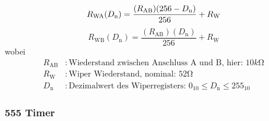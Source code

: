 \begin{equation}
    R_{\text{\text{WA}}}(D_{\text{n}}) = \frac{(R_{\text{AB}}) (256 - D_{\text{n}})}{256} + R_{\text{W}}
    \label{eq:resistance1}
\end{equation}
\begin{equation}
    R_{\text{WB}}(D_{\text{n}}) = \frac{(R_{\text{AB}}) (D_{\text{n}})}{256} + R_{\text{W}}
    \label{eq:resistance2}
\end{equation}
wobei
\begin{align*}
    R_{\text{AB}} &: \text{Wiederstand zwischen Anschluss A und B, hier: } 10\si{k\ohm} \\
    R_{\text{W}} &: \text{Wiper Wiederstand, nominal: } 52\si{\ohm}  \\
    D_{\text{n}} &: \text{Dezimalwert des Wiperregisters: } 0_{10} \leq D_{\text{n}} \leq 255_{10}
\end{align*}

\subsubsection{555 Timer}


